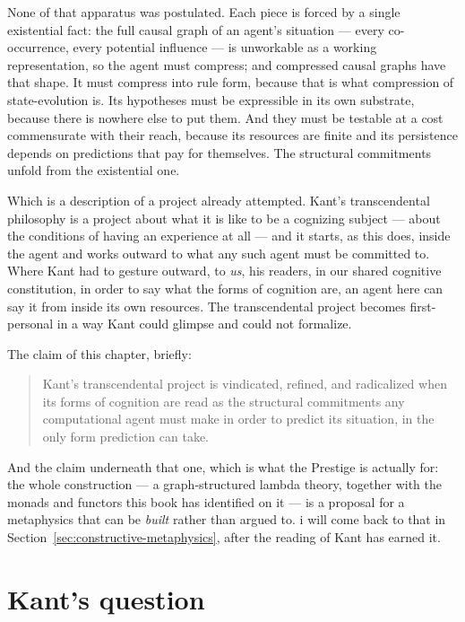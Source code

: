 None of that apparatus was postulated.
Each piece is forced by a single existential fact: the full causal
graph of an agent's situation --- every co-occurrence, every
potential influence --- is unworkable as a working representation,
so the agent must compress; and compressed causal graphs have that
shape.
It must compress into rule form, because that is what compression
of state-evolution is.
Its hypotheses must be expressible in its own substrate, because
there is nowhere else to put them.
And they must be testable at a cost commensurate with their reach,
because its resources are finite and its persistence depends on
predictions that pay for themselves.
The structural commitments unfold from the existential one.

Which is a description of a project already attempted.
Kant's transcendental philosophy is a project about what it is like
to be a cognizing subject --- about the conditions of having an
experience at all --- and it starts, as this does, inside the agent
and works outward to what any such agent must be committed to.
Where Kant had to gesture outward, to \emph{us}, his readers, in
our shared cognitive constitution, in order to say what the forms
of cognition are, an agent here can say it from inside its own
resources.
The transcendental project becomes first-personal in a way Kant
could glimpse and could not formalize.

The claim of this chapter, briefly:

\begin{quote}
Kant's transcendental project is vindicated, refined, and
radicalized when its forms of cognition are read as the structural
commitments any computational agent must make in order to predict
its situation, in the only form prediction can take.
\end{quote}

\noindent
And the claim underneath that one, which is what the Prestige is
actually for: the whole construction --- a graph-structured lambda
theory, together with the monads and functors this book has
identified on it --- is a proposal for a metaphysics that can be
\emph{built} rather than argued to.
i will come back to that in Section~\ref{sec:constructive-metaphysics},
after the reading of Kant has earned it.

\section{Kant's question}
\label{sec:kant-recap}

